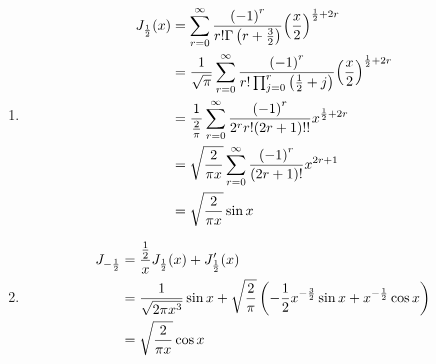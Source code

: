 \item

\begin{enumerate}[wide, labelindent = 0pt, label = (\alph*)]
\item
\begin{align*}
    J_{\frac{1}{2}}(x)
    &= \sum_{r = 0}^\infty \frac{{(-1)}^r}{r!\Gamma\left( r + \frac{3}{2} \right)} {\left( \frac{x}{2} \right)}^{\frac{1}{2} + 2r} \\
    &= \frac{1}{\sqrt{\pi}} \sum_{r = 0}^\infty \frac{{(-1)}^r}{
        r! \prod_{j = 0}^r \left( \frac{1}{2} + j \right)
    } {\left( \frac{x}{2} \right)}^{\frac{1}{2} + 2r} \\
    &= \frac{1}{\frac{2}{\pi}} \sum_{r = 0}^\infty \frac{{(-1)}^r}{
        2^r r! (2r + 1)!!
    } x^{\frac{1}{2} + 2r} \\
    &= \sqrt{\frac{2}{\pi x}} \sum_{r = 0}^\infty
       \frac{{(-1)}^r}{(2r + 1)!} x^{2r + 1} \\
    &= \sqrt{\frac{2}{\pi x}} \sin x
\end{align*}

\item
\begin{align*}
    J_{-\frac{1}{2}}
    &= \frac{\frac{1}{2}}{x} J_{\frac{1}{2}}(x) + J_{\frac{1}{2}}'(x) \\
    &= \frac{1}{\sqrt{2\pi x^3}} \sin x + \sqrt{\frac{2}{\pi}} \left(
        -\frac{1}{2} x^{-\frac{3}{2}} \sin x + x^{-\frac{1}{2}} \cos x
    \right) \\
    &= \sqrt{\frac{2}{\pi x}} \cos x
\end{align*}

\end{enumerate}
